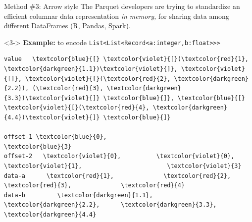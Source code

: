 \documentclass{beamer}
\begin{document}
\begin{frame}[fragile]{Method \#3: Arrow style}
\vspace{0.5 cm}
The Parquet developers are trying to standardize an efficient columnar data representation {\it in memory,} for sharing data among different DataFrames (R, Pandas, Spark).

\vspace{0.25 cm}

\vspace{0.25 cm}

\vspace{0.25 cm}
\begin{uncoverenv}<3->
{\bf Example:} to encode {\tt\footnotesize List<List<Record<a:integer,b:float>>>}

\scriptsize\bf
\begin{Verbatim}[commandchars=\\\{\}]
value   \textcolor{blue}{[} \textcolor{violet}{[}(\textcolor{red}{1}, \textcolor{darkgreen}{1.1})\textcolor{violet}{]}, \textcolor{violet}{[]}, \textcolor{violet}{[}(\textcolor{red}{2}, \textcolor{darkgreen}{2.2}), (\textcolor{red}{3}, \textcolor{darkgreen}{3.3})\textcolor{violet}{]} \textcolor{blue}{]}, \textcolor{blue}{[} \textcolor{violet}{[}(\textcolor{red}{4}, \textcolor{darkgreen}{4.4})\textcolor{violet}{]} \textcolor{blue}{]}

offset-1 \textcolor{blue}{0},                                        \textcolor{blue}{3}
offset-2   \textcolor{violet}{0},          \textcolor{violet}{0},  \textcolor{violet}{1},                        \textcolor{violet}{3}
data-a      \textcolor{red}{1},              \textcolor{red}{2},        \textcolor{red}{3},              \textcolor{red}{4}
data-b         \textcolor{darkgreen}{1.1},            \textcolor{darkgreen}{2.2},      \textcolor{darkgreen}{3.3},            \textcolor{darkgreen}{4.4}
\end{Verbatim}
\end{uncoverenv}

\vspace{0.25 cm}\normalsize\sf
{}
\end{frame}
\end{document}
